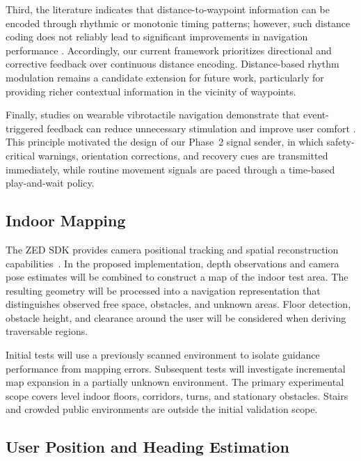 \documentclass[12pt]{report}
\begin{document}
Third, the literature indicates that distance-to-waypoint information can be encoded through rhythmic or monotonic timing patterns; however, such distance coding does not reliably lead to significant improvements in navigation performance \cite{vanveen2004waypoint, vanerp2005waypoint, pielot2010tactilewayfinder, straub2009distance, steltenpohl2013vibrobelt}. Accordingly, our current framework prioritizes directional and corrective feedback over continuous distance encoding. Distance-based rhythm modulation remains a candidate extension for future work, particularly for providing richer contextual information in the vicinity of waypoints.

Finally, studies on wearable vibrotactile navigation demonstrate that event-triggered feedback can reduce unnecessary stimulation and improve user comfort \cite{scheggi2017cooperative}. This principle motivated the design of our Phase~2 signal sender, in which safety-critical warnings, orientation corrections, and recovery cues are transmitted immediately, while routine movement signals are paced through a time-based play-and-wait policy.

\subsection*{Indoor Mapping}

The ZED SDK provides camera positional tracking and spatial reconstruction capabilities~\cite{zedtracking,zedmapping}. In the proposed implementation, depth observations and camera pose estimates will be combined to construct a map of the indoor test area. The resulting geometry will be processed into a navigation representation that distinguishes observed free space, obstacles, and unknown areas. Floor detection, obstacle height, and clearance around the user will be considered when deriving traversable regions.

Initial tests will use a previously scanned environment to isolate guidance performance from mapping errors. Subsequent tests will investigate incremental map expansion in a partially unknown environment. The primary experimental scope covers level indoor floors, corridors, turns, and stationary obstacles. Stairs and crowded public environments are outside the initial validation scope.

\subsection*{User Position and Heading Estimation}
\end{document}
